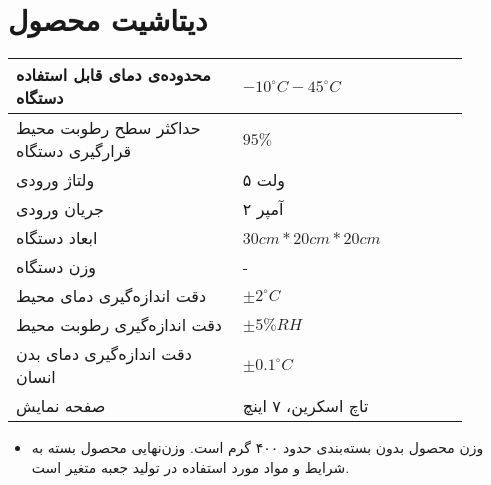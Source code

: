 \chapter{دیتاشیت محصول}



\begin{table}[ht!]
	\begin{tabular}{|p{0.45\linewidth}|p{0.45\linewidth}|}
		\hline		
				محدوده‌ی دمای قابل استفاده دستگاه
		&    $-10 ^\circ C - 45 ^\circ C$
		\\ \hline
		حداکثر سطح رطوبت محیط قرارگیری دستگاه 
		&   
		$		95\%$		
		\\ \hline
		ولتاژ ورودی
		&   
	۵ ولت	
		\\ \hline
		جریان ورودی
		&   
۲ آمپر
		\\ \hline
		ابعاد دستگاه
		&   
$30cm * 20cm * 20cm$
		\\ \hline
		وزن دستگاه
		&   
- 
		\\ \hline
		دقت اندازه‌گیری دمای محیط     &
		$\pm2 ^\circ C$
		 \\ \hline
		دقت اندازه‌گیری رطوبت محیط &   
				$\pm5\%RH$
		 \\ \hline
		 دقت اندازه‌گیری دمای بدن انسان
&
$ \pm 0.1 ^\circ C$
		 \\ \hline	 
صفحه نمایش
		 &
تاچ اسکرین، ۷ اینچ
		 \\ \hline
	\end{tabular}
\end{table}

\begin{itemize}
	\item 
	وزن محصول بدون بسته‌بندی حدود ۴۰۰ گرم است. وزن‌نهایی محصول بسته به شرایط و مواد مورد استفاده در تولید جعبه متغیر است.

\end{itemize}